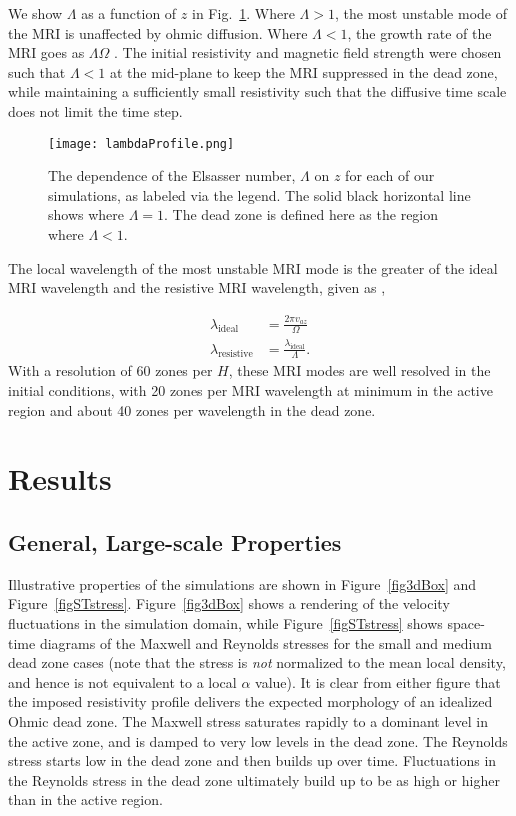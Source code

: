 \noindent We show $\Lambda$ as a function of $z$ in Fig.~\ref{figElsasser}.  Where $\Lambda>1$, the most unstable mode of the MRI is unaffected by ohmic diffusion.  Where $\Lambda<1$, the growth rate of the MRI goes as $\Lambda \Omega$ \citep{sano99}.  The initial resistivity and magnetic field strength were chosen such that $\Lambda<1$ at the mid-plane to keep the MRI suppressed in the dead zone, while maintaining a sufficiently small resistivity such that the diffusive time scale does not limit the time step. 

\begin{figure}[p]
\centering
\texttt{[image: lambdaProfile.png]}
\caption{The dependence of the Elsasser number, $\Lambda$ on $z$ for each of our simulations, as labeled via the legend.  The solid black horizontal line shows where $\Lambda=1$. The dead zone
is defined here as the region where $\Lambda < 1$.}
\label{figElsasser}
\end{figure}

The local wavelength of the most unstable MRI mode is the greater of the ideal MRI wavelength and the resistive MRI wavelength, given as \citep{sano99},

\begin{align}
\lambda_{\text{ideal}} &= \frac{2\pi v_{az}}{\Omega}   \\             
\lambda_{\text{resistive}} &= \frac{\lambda_{\text{ideal}}}{\Lambda}. 
\end{align}
With a resolution of 60 zones per $H$, these MRI modes are well resolved in the initial conditions, with 20 zones per MRI wavelength at minimum in the active region and about 40 zones per wavelength in the dead zone. 





\section{Results}


\subsection{General, Large-scale Properties}
Illustrative properties of the simulations are shown in Figure~\ref{fig3dBox} and Figure~\ref{figSTstress}. 
Figure~\ref{fig3dBox} shows a rendering of the velocity fluctuations in the simulation domain, while 
Figure~\ref{figSTstress}  shows space-time diagrams of the Maxwell and Reynolds stresses for the 
small and medium dead zone cases (note that the stress is {\em not} normalized to the mean local 
density, and hence is not equivalent to a local $\alpha$ value). 
It is clear from either figure that the imposed resistivity profile 
delivers the expected morphology of an idealized Ohmic dead zone. The Maxwell stress saturates 
rapidly to a dominant level in the active zone, and is damped to very low levels in the dead zone. 
The Reynolds stress starts low in the dead zone and then builds up over time. Fluctuations in the Reynolds stress in the dead zone ultimately build up to be as high or higher than in the active region.     

